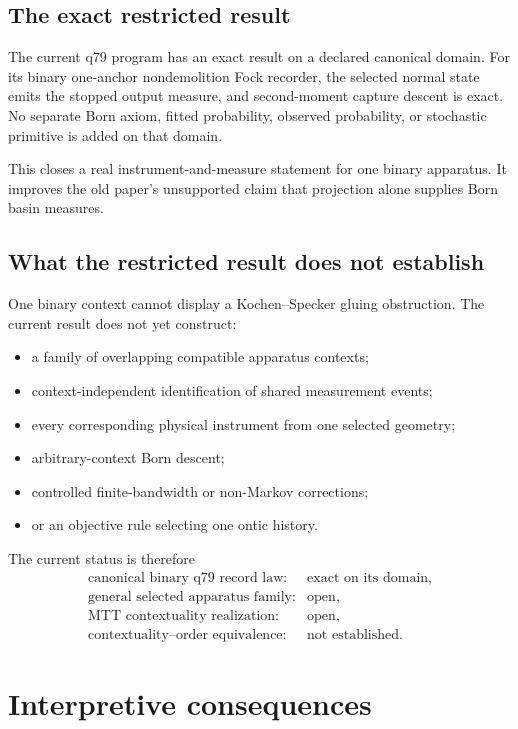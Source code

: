 \documentclass[11pt]{article}
\begin{document}
\subsection{The exact restricted result}

The current q79 program has an exact result on a declared canonical domain.
For its binary one-anchor nondemolition Fock recorder, the selected normal
state emits the stopped output measure, and second-moment capture descent is
exact. No separate Born axiom, fitted probability, observed probability, or
stochastic primitive is added on that domain.

This closes a real instrument-and-measure statement for one binary apparatus.
It improves the old paper's unsupported claim that projection alone supplies
Born basin measures.

\subsection{What the restricted result does not establish}

One binary context cannot display a Kochen--Specker gluing obstruction. The
current result does not yet construct:
\begin{itemize}
\item a family of overlapping compatible apparatus contexts;
\item context-independent identification of shared measurement events;
\item every corresponding physical instrument from one selected geometry;
\item arbitrary-context Born descent;
\item controlled finite-bandwidth or non-Markov corrections;
\item or an objective rule selecting one ontic history.
\end{itemize}

The current status is therefore
\[
\begin{array}{ll}
\text{canonical binary q79 record law:}&\text{exact on its domain},\\
\text{general selected apparatus family:}&\text{open},\\
\text{MTT contextuality realization:}&\text{open},\\
\text{contextuality--order equivalence:}&\text{not established}.
\end{array}
\]

\section{Interpretive consequences}
\end{document}
